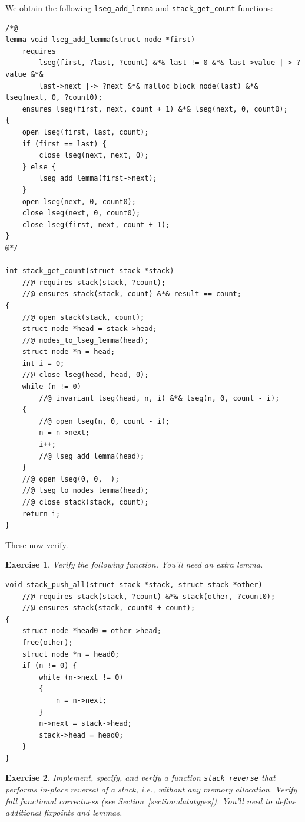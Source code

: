 \documentclass{article}
\newtheorem{exercise}{Exercise}
\begin{document}
We obtain the following \lstinline!lseg_add_lemma! and
\lstinline!stack_get_count! functions:
\begin{lstlisting}
/*@
lemma void lseg_add_lemma(struct node *first)
    requires
        lseg(first, ?last, ?count) &*& last != 0 &*& last->value |-> ?value &*&
        last->next |-> ?next &*& malloc_block_node(last) &*& lseg(next, 0, ?count0);
    ensures lseg(first, next, count + 1) &*& lseg(next, 0, count0);
{
    open lseg(first, last, count);
    if (first == last) {
        close lseg(next, next, 0);
    } else {
        lseg_add_lemma(first->next);
    }
    open lseg(next, 0, count0);
    close lseg(next, 0, count0);
    close lseg(first, next, count + 1);
}
@*/

int stack_get_count(struct stack *stack)
    //@ requires stack(stack, ?count);
    //@ ensures stack(stack, count) &*& result == count;
{
    //@ open stack(stack, count);
    struct node *head = stack->head;
    //@ nodes_to_lseg_lemma(head);
    struct node *n = head;
    int i = 0;
    //@ close lseg(head, head, 0);
    while (n != 0)
        //@ invariant lseg(head, n, i) &*& lseg(n, 0, count - i);
    {
        //@ open lseg(n, 0, count - i);
        n = n->next;
        i++;
        //@ lseg_add_lemma(head);
    }
    //@ open lseg(0, 0, _);
    //@ lseg_to_nodes_lemma(head);
    //@ close stack(stack, count);
    return i;
}
\end{lstlisting}
These now verify.

\begin{exercise}\label{exercise:push_all}
Verify the following function. You'll need an extra lemma.
\end{exercise}
\begin{lstlisting}
void stack_push_all(struct stack *stack, struct stack *other)
    //@ requires stack(stack, ?count) &*& stack(other, ?count0);
    //@ ensures stack(stack, count0 + count);
{
    struct node *head0 = other->head;
    free(other);
    struct node *n = head0;
    if (n != 0) {
        while (n->next != 0)
        {
            n = n->next;
        }
        n->next = stack->head;
        stack->head = head0;
    }
}
\end{lstlisting}

\begin{exercise}\label{exercise:reverse}
Implement, specify, and verify a function
\lstinline!stack_reverse! that performs in-place reversal of a
stack, i.e., without any memory allocation. Verify full
functional correctness (see Section~\ref{section:datatypes}).
You'll need to define additional fixpoints and lemmas.
\end{exercise}
\end{document}
